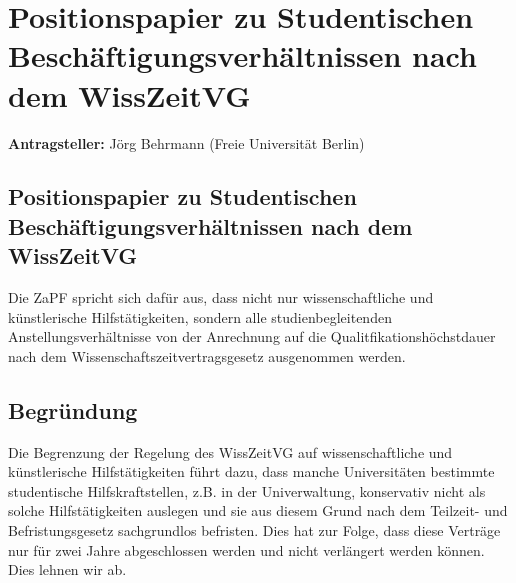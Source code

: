 \documentclass[draft,12pt,oneside]{scrartcl}
\begin{document}
\section*{Positionspapier zu Studentischen Beschäftigungsverhältnissen nach dem WissZeitVG}

\textbf{Antragsteller:} Jörg Behrmann (Freie Universität Berlin)

\subsection*{Positionspapier zu Studentischen Beschäftigungsverhältnissen nach dem WissZeitVG}

Die ZaPF spricht sich dafür aus, dass nicht nur wissenschaftliche und
künstlerische Hilfstätigkeiten, sondern alle studienbegleitenden
Anstellungsverhältnisse von der Anrechnung auf die Qualitfikationshöchstdauer
nach dem Wissenschaftszeitvertragsgesetz ausgenommen werden.

\subsection*{Begründung}

Die Begrenzung der Regelung des WissZeitVG auf wissenschaftliche und
künstlerische Hilfstätigkeiten führt dazu, dass manche Universitäten bestimmte
studentische Hilfskraftstellen, z.B. in der Univerwaltung, konservativ nicht als
solche Hilfstätigkeiten auslegen und sie aus diesem Grund nach dem Teilzeit- und
Befristungsgesetz sachgrundlos befristen. Dies hat zur Folge, dass diese
Verträge nur für zwei Jahre abgeschlossen werden und nicht verlängert werden
können. Dies lehnen wir ab.
\end{document}
